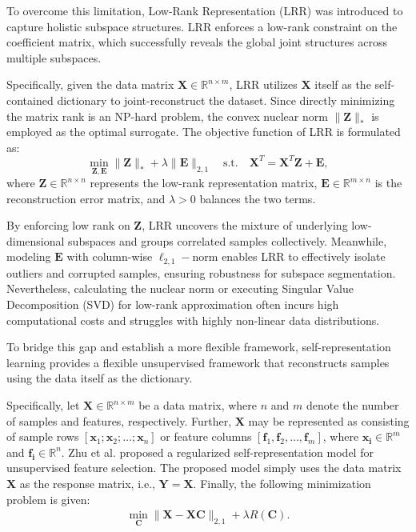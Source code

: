 \documentclass[ASNA,twocolumn]{USG} %
\begin{document}
To overcome this limitation, Low-Rank Representation (LRR) \cite{6180173} was introduced to capture holistic subspace structures. LRR enforces a low-rank constraint on the coefficient matrix, which successfully reveals the global joint structures across multiple subspaces. 

Specifically, given the data matrix $\boldsymbol{X} \in \mathbb{R}^{n \times m}$, LRR utilizes $\boldsymbol{X}$ itself as the self-contained dictionary to joint-reconstruct the dataset. Since directly minimizing the matrix rank is an NP-hard problem, the convex nuclear norm $\|\boldsymbol{Z}\|_*$ is employed as the optimal surrogate. The objective function of LRR is formulated as:
\begin{equation}\label{pre_lrr}
\min_{\boldsymbol{Z}, \boldsymbol{E}} \|\boldsymbol{Z}\|_* + \lambda \|\boldsymbol{E}\|_{2,1} \quad \text{s.t.} \quad \boldsymbol{X}^T = \boldsymbol{X}^T\boldsymbol{Z} + \boldsymbol{E},
\end{equation}
where $\boldsymbol{Z} \in \mathbb{R}^{n \times n}$ represents the low-rank representation matrix, $\boldsymbol{E} \in \mathbb{R}^{m \times n}$ is the reconstruction error matrix, and $\lambda > 0$ balances the two terms. 

By enforcing low rank on $\boldsymbol{Z}$, LRR uncovers the mixture of underlying low-dimensional subspaces and groups correlated samples collectively. Meanwhile, modeling $\boldsymbol{E}$ with column-wise $\ell_{2,1}-$norm enables LRR to effectively isolate outliers and corrupted samples, ensuring robustness for subspace segmentation.
Nevertheless, calculating the nuclear norm or executing Singular Value Decomposition (SVD) for low-rank approximation often incurs high computational costs and struggles with highly non-linear data distributions.

To bridge this gap and establish a more flexible framework, self-representation learning provides a flexible unsupervised framework that reconstructs samples using the data itself as the dictionary.

Specifically, let $\boldsymbol{X}\in \mathbb{R}^{n\times m}$ be a data matrix, where $n$ and $m$ denote the number of samples and features, respectively. Further, $\boldsymbol{X}$ may be represented as consisting of sample rows $[\boldsymbol{x}_1;\boldsymbol{x}_2;\dots;\boldsymbol{x}_n]$ or feature columns $[\boldsymbol{f}_1,\boldsymbol{f}_2,\dots,\boldsymbol{f}_m]$, where $\boldsymbol{x_i}\in \mathbb{R}^m$ and $\boldsymbol{f_i}\in \mathbb{R}^n$. Zhu et al. \cite{zhu2015unsupervised} proposed a regularized self-representation model for unsupervised feature selection. The proposed model simply uses the data matrix $\boldsymbol{X}$ as the response matrix, i.e., $ \boldsymbol{Y} = \boldsymbol{X} $. Finally, the following minimization problem is given:
\begin{eqnarray}
	\min_{\boldsymbol{C}}\|\boldsymbol{X}-\boldsymbol{X}\boldsymbol{C}\|_{2,1}+\lambda R(\boldsymbol{C}).
\end{eqnarray}
\end{document}
